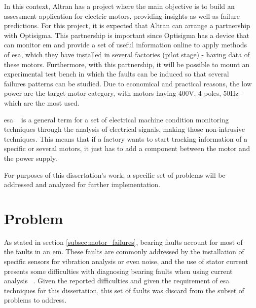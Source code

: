 In this context, Altran has a project where the main objective is to build an assessment application for electric motors, providing insights as well as failure predictions. For this project, it is expected that Altran can arrange a partnership with Optisigma. This partnership is important since Optisigma has a device that can monitor \acrlong{em} and provide a set of useful information online to apply methods of \acrfull{esa}, which they have installed in several factories (pilot stage) - having data of these motors. Furthermore, with this partnership, it will be possible to mount an experimental test bench in which the faults can be induced so that several failures patterns can be studied. Due to economical and practical reasons, the low power  are the target motor category, with motors having 400V, 4 poles, 50Hz - which are the most used.

\Acrshort{esa} ~\cite{Bonaldi2012} is a general term for a set of electrical machine condition monitoring techniques through the analysis of electrical signals, making those non-intrusive techniques. This means that if a factory wants to start tracking information of a specific or several motors, it just has to add a component between the motor and the power supply.

For purposes of this dissertation's work, a specific set of problems will be addressed and analyzed for further implementation.





\section{Problem} %
\label{sec:problem}

As stated in section \ref{subsec:motor_failures}, bearing faults account for most of the faults in an \acrlong{em}. These faults are commonly addressed by the installation of specific sensors for vibration analysis or even noise, and the use of stator current presents some difficulties with diagnosing bearing faults when using current analysis ~\cite{Riera-Guasp2015}.  Given the reported difficulties and given the requirement of \Acrshort{esa} techniques for this dissertation, this set of faults was discard from the subset of problems to address.

